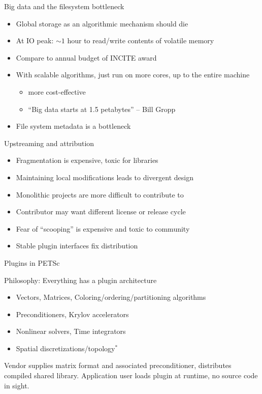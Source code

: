 \documentclass{beamer}
\begin{document}
\begin{frame}{Big data and the filesystem bottleneck}
  \begin{itemize}
  \item Global storage as an algorithmic mechanism should die
  \item At IO peak: $\sim 1$ hour to read/write contents of volatile memory
  \item Compare to annual budget of INCITE award
  \item With scalable algorithms, just run on more cores, up to the entire machine
    \begin{itemize}
    \item more cost-effective
    \item ``Big data starts at 1.5 petabytes'' -- Bill Gropp
    \end{itemize}
  \item File system metadata is a bottleneck
  \end{itemize}
\end{frame}
\begin{frame}{Upstreaming and attribution}
  \begin{itemize}
  \item Fragmentation is expensive, toxic for libraries
  \item Maintaining local modifications leads to divergent design
  \item Monolithic projects are more difficult to contribute to
  \item Contributor may want different license or release cycle
  \item Fear of ``scooping'' is expensive and toxic to community
  \item Stable plugin interfaces fix distribution
  \end{itemize}
\end{frame}
\begin{frame}{Plugins in PETSc}
\begin{block}{Philosophy: Everything has a plugin architecture}
\begin{itemize}
  \item Vectors, Matrices, Coloring/ordering/partitioning algorithms
  \item Preconditioners, Krylov accelerators
  \item Nonlinear solvers, Time integrators
  \item Spatial discretizations/topology$^*$
\end{itemize}
\end{block}
\begin{example}
	Vendor supplies matrix format and associated preconditioner, distributes
	compiled shared library.  Application user loads plugin at runtime, no source
	code in sight.
\end{example}
\end{frame}
\end{document}

